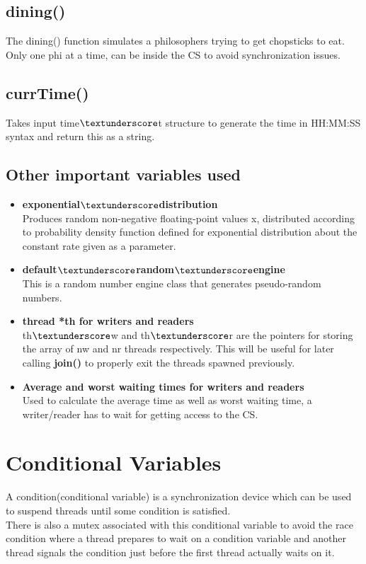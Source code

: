 \documentclass[12pt]{article}
\begin{document}
\subsection{dining()}
The dining() function simulates a philosophers trying to get chopsticks to eat.\\
Only one phi at a time, can be inside the CS to avoid synchronization issues.

\subsection{currTime()}
Takes input time$\textunderscore$t structure to generate the time in HH:MM:SS syntax and return this as a string.

\subsection{Other important variables used}
\begin{itemize}
\item \textbf{exponential$\textunderscore$distribution}\\
Produces random non-negative floating-point values x, distributed according to probability density function defined for exponential distribution about the constant rate given as a parameter.
\item \textbf{default$\textunderscore$random$\textunderscore$engine}\\
This is a random number engine class that generates pseudo-random numbers.
\item \textbf{thread *th for writers and readers}\\
th$\textunderscore$w and th$\textunderscore$r are the pointers for storing the array of nw and nr threads respectively. This will be useful for later calling \textbf{join()} to properly exit the threads spawned previously.
\item \textbf{Average and worst waiting times for writers and readers}\\
Used to calculate the average time as well as worst waiting time, a writer/reader has to wait for getting access to the CS.\\
\end{itemize}

\section{Conditional Variables}
A condition(conditional variable) is a synchronization device which can be used to suspend threads until some condition is satisfied.\\
There is also a mutex associated with this conditional variable to avoid the race condition where a thread prepares to wait on a condition variable and another thread signals the condition just before the first thread actually waits on it.\\ 
\end{document}
